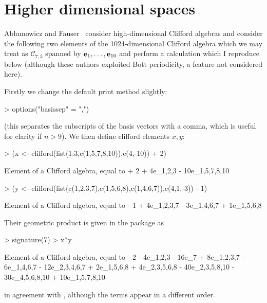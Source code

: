 \documentclass{birkjour}
\theoremstyle{definition}
\theoremstyle{remark}
\numberwithin{equation}{section}
\begin{document}
\section{Higher dimensional spaces}

Ab\l{}amowicz and Fauser~\cite{ablamowicz2012} consider
high-dimensional Clifford algebras and consider the following two
elements of the 1024-dimensional Clifford algebra which we may treat
as ${\mathcal C}_{7,3}$ spanned by ${\bf e}_{1},\ldots,{\bf e}_{10}$ and perform
a calculation which I reproduce below (although these authors
exploited Bott periodicity, a feature not considered here).

Firstly we change the default print method slightly:

\begin{Schunk}
\begin{Sinput}
> options("basissep" = ",")
\end{Sinput}
\end{Schunk}
%
(this separates the subscripts of the basis vectors with a comma,
which is useful for clarity if $n>9$).  We then define clifford
elements $x,y$:

\begin{Schunk}
\begin{Sinput}
> (x <- clifford(list(1:3,c(1,5,7,8,10)),c(4,-10)) + 2)
\end{Sinput}
\begin{Soutput}
Element of a Clifford algebra, equal to
+ 2 + 4e_1,2,3 - 10e_1,5,7,8,10
\end{Soutput}
\begin{Sinput}
> (y <- clifford(list(c(1,2,3,7),c(1,5,6,8),c(1,4,6,7)),c(4,1,-3)) - 1)
\end{Sinput}
\begin{Soutput}
Element of a Clifford algebra, equal to
- 1 + 4e_1,2,3,7 - 3e_1,4,6,7 + 1e_1,5,6,8
\end{Soutput}
\end{Schunk}
%
Their geometric product is given in the package as

\begin{Schunk}
\begin{Sinput}
> signature(7)
> x*y
\end{Sinput}
\begin{Soutput}
Element of a Clifford algebra, equal to
- 2 - 4e_1,2,3 - 16e_7 + 8e_1,2,3,7 - 6e_1,4,6,7 - 12e_2,3,4,6,7 +
2e_1,5,6,8 + 4e_2,3,5,6,8 - 40e_2,3,5,8,10 - 30e_4,5,6,8,10 +
10e_1,5,7,8,10
\end{Soutput}
\end{Schunk}
%
in agreement with \cite{ablamowicz2012}, although the terms appear in
a different order.
\end{document}
